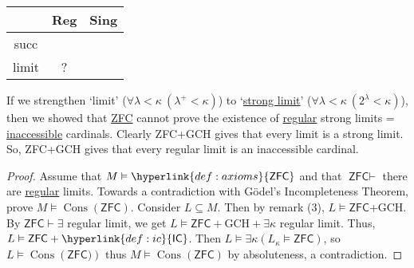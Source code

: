 \documentclass{article}
\newcommand{\1}{\mathbbm{1}}
\newcommand{\cmark}{\ding{51}}%
\newcommand{\xmark}{\ding{55}}%
\DeclareMathOperator{\cons}{Cons}
\let\models\vDash
\begin{document}
\begin{center}
\begin{tabular}{c|cc}
  & Reg & Sing \\ \hline
  succ & \cmark & \xmark \\
  limit & ? & \cmark
\end{tabular}
\end{center}
If we strengthen `limit' ($\forall \lambda < \kappa\  (\lambda^+ < \kappa)$) to `\hyperlink{def:slim}{strong limit}' ($\forall \lambda < \kappa\ (2^\lambda < \kappa)$), then we showed that \hyperlink{def:axioms}{\textsf{ZFC}} cannot prove the existence of \hyperlink{def:reg}{regular} strong limits = \hyperlink{def:inacc}{inaccessible} cardinals.
Clearly \textsf{ZFC}+GCH gives that every limit is a strong limit. So, \textsf{ZFC}+GCH gives that every regular limit is an inaccessible cardinal.
\begin{proof}
  Assume that $M \models \hyperlink{def:axioms}{\textsf{ZFC}}$ and that $\textsf{ZFC} \vdash$ there are \hyperlink{def:reg}{regular} limits.
  Towards a contradiction with G\"odel's Incompleteness Theorem, prove $M \models \cons(\textsf{ZFC})$.
  Consider $L \subseteq M$. Then by remark (3), $L \models \textsf{ZFC}$+GCH.
  By $\textsf{ZFC}\vdash \exists$ regular limit, we get $L \models \textsf{ZFC}+\text{GCH}+\exists \kappa$ regular limit. Thus, $L \models \textsf{ZFC}+\hyperlink{def:ic}{\textsf{IC}}$.
  Then $L \models \exists \kappa (L_\kappa \models \textsf{ZFC})$, so $L \models \cons(\textsf{ZFC)})$ thus $M \models \cons(\textsf{ZFC})$ by absoluteness, a contradiction.
\end{proof}
\end{document}
